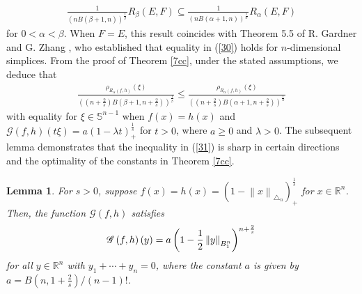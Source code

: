 \documentclass[preprint,12pt]{elsarticle}
\newtheorem{lem}{Lemma}
\begin{document}
\begin{eqnarray}\label{30}
\frac{1}{\left (  n   B\left ( \beta +1 ,n \right )  \right )^{\frac{1}{\beta } }  }R_{\beta  }\left ( E,F \right )\subseteq \frac{1}{\left (  n   B\left ( \alpha +1 ,n\right )  \right )^{\frac{1}{\alpha  } }
}R_{\alpha }\left ( E,F\right )
\end{eqnarray}
for $0< \alpha < \beta $. When $F=E$, this result coincides with Theorem 5.5 of R. Gardner and G. Zhang \cite{GZ98}, who established that equality in (\ref{30}) holds for $n$-dimensional simplices. 
From the proof of Theorem \ref{7cc}, under the stated assumptions, we deduce that
\begin{eqnarray}\label{31}
\frac{\rho _{R_{\alpha }\left ( f,h \right ) }\left ( \xi  \right ) }{\left ( \left ( n+\frac{2}{s}   \right )B\left ( \beta +1 ,n+\frac{2}{s} \right )  \right )^{\frac{1}{\beta } }  }\le \frac{\rho _{R_{\alpha }\left ( f,h \right )}\left ( \xi  \right )}{\left ( \left ( n+\frac{2}{s}   \right )B\left ( \alpha +1 ,n+\frac{2}{s} \right )  \right )^{\frac{1}{\alpha  } }  }
\end{eqnarray}
with equality for $\xi \in \mathbb{S}^{n-1} $ when $f\left ( x \right )=h\left ( x \right ) $ and $\mathscr{G}\left ( f,h \right )\left ( t\xi  \right )=a\left ( 1-\lambda t \right )^{\frac{1}{s} } _{+}  $ for $t> 0$, where $a\ge 0$ and $\lambda > 0$. The subsequent lemma demonstrates that the inequality in (\ref{31}) is sharp in certain directions and the optimality of the constants in Theorem \ref{7cc}.
\begin{lem}\cite[Lemma 22]{JM22}\label{5.5}
For $s>0$, suppose $f\left ( x \right ) =h\left ( x \right )=\left ( 1-\left \| x   \right \|_{\bigtriangleup _{n} }  \right )^{\frac{1}{s} } _{+}$ for $x\in \mathbb{R}^n$. Then, the function $\mathscr{G}\left ( f,h \right )$ satisfies
\begin{eqnarray}
	\mathscr{G}\left ( f,h \right )\left ( y \right )=a\left ( 1-\frac{1}{2} \left \| y \right \|_{B^{n} _{1}  }
	\right )^{n+\frac{2}{s} } 	\notag
\end{eqnarray}
for all $y\in \mathbb{R}^n$ with $y_{1}+\cdots +y_{n}=0$, where the constant $a$ is given by $a=B\left ( n,1+\frac{2}{s}  \right )/\left ( n-1 \right )!$.
\end{lem}
\end{document}
